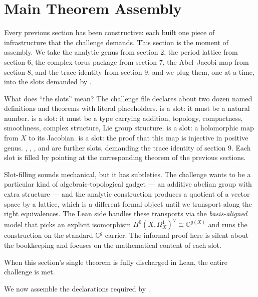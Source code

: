 \section{Main Theorem Assembly}
\label{sec:main-assembly}

\begin{layman}
Every previous section has been constructive: each built one piece
of infrastructure that the challenge demands. This section is the
moment of assembly. We take the analytic genus from section 2, the
period lattice from section 6, the complex-torus package from
section 7, the Abel--Jacobi map from section 8, and the trace
identity from section 9, and we plug them, one at a time, into
the slots demanded by .

What does ``the slots'' mean? The challenge file declares about
two dozen named definitions and theorems with literal 
placeholders.  is a slot: it must be a natural
number.  is a slot: it must be a type carrying
addition, topology, compactness, smoothness, complex structure,
Lie group structure.  is a slot: a holomorphic
map from \(X\) to its Jacobian.  is a slot:
the proof that this map is injective in positive genus.
, , , and
 are further slots, demanding the
trace identity of section 9. Each slot is filled by pointing
at the corresponding theorem of the previous sections.

Slot-filling sounds mechanical, but it has subtleties. The
challenge wants  to be a particular kind of
algebraic-topological gadget --- an additive abelian group with
extra structure --- and the analytic construction produces a
quotient of a vector space by a lattice, which is a different
formal object until we transport along the right equivalences.
The Lean side handles these transports via the
\emph{basis-aligned} model that picks an explicit isomorphism
\(H^0(X,\Omega^1_X)^{\vee} \cong \mathbb{C}^{g(X)}\) and runs the
construction on the standard \(\mathbb{C}^g\) carrier. The
informal proof here is silent about the bookkeeping and focuses
on the mathematical content of each slot.

When this section's single theorem is fully discharged in Lean,
the entire challenge is met.
\end{layman}

We now assemble the declarations required by .

